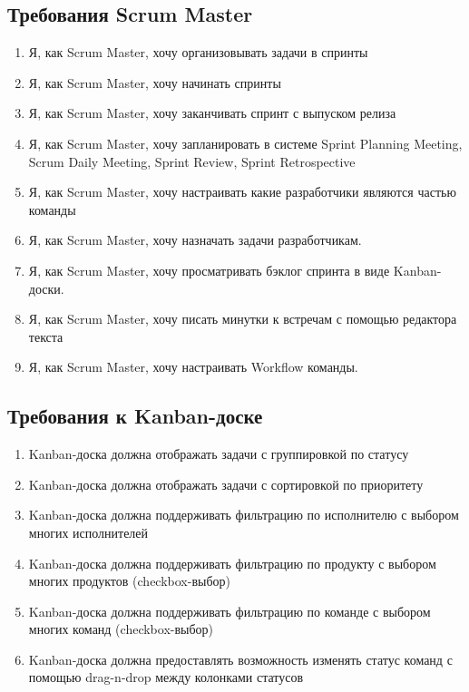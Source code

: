 \subsection{Требования Scrum Master}
\begin{enumerate}[label=\textbf{SMR\arabic*}.]
  \item Я, как Scrum Master, хочу организовывать задачи в спринты
  \item Я, как Scrum Master, хочу начинать спринты
  \item Я, как Scrum Master, хочу заканчивать спринт с выпуском релиза
  \item Я, как Scrum Master, хочу запланировать в системе
        Sprint Planning Meeting, Scrum Daily Meeting, Sprint Review, Sprint Retrospective
  \item Я, как Scrum Master, хочу настраивать какие разработчики являются частью команды
  \item Я, как Scrum Master, хочу назначать задачи разработчикам.
  \item Я, как Scrum Master, хочу просматривать бэклог спринта в виде Kanban-доски.
  \item Я, как Scrum Master, хочу писать минутки к встречам с помощью редактора текста
  \item Я, как Scrum Master, хочу настраивать Workflow команды.
\end{enumerate}

\subsection{Требования к Kanban-доске}
\begin{enumerate}[label=\textbf{KBR\arabic*}.]
  \item Kanban-доска должна отображать задачи с группировкой по статусу
  \item Kanban-доска должна отображать задачи с сортировкой по приоритету
  \item Kanban-доска должна поддерживать фильтрацию по исполнителю с выбором
        многих исполнителей
  \item Kanban-доска должна поддерживать фильтрацию по продукту с выбором
        многих продуктов (checkbox-выбор)
  \item Kanban-доска должна поддерживать фильтрацию по команде с выбором
        многих команд (checkbox-выбор)
  \item Kanban-доска должна предоставлять возможность изменять статус
        команд с помощью drag-n-drop между колонками статусов
\end{enumerate}

